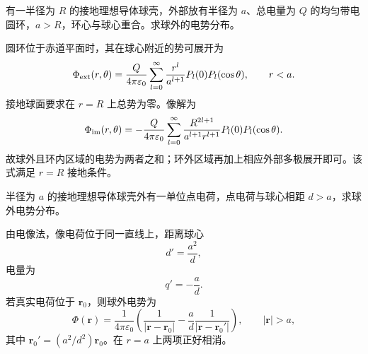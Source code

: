 \begin{question}
有一半径为 \(R\) 的接地理想导体球壳，外部放有半径为 \(a\)、总电量为 \(Q\) 的均匀带电圆环，\(a>R\)，环心与球心重合。求球外的电势分布。
\begin{solution}
圆环位于赤道平面时，其在球心附近的势可展开为
\[
\Phi_{\rm ext}(r,\theta)=\frac{Q}{4\pi\varepsilon_0}
\sum_{l=0}^{\infty}\frac{r^l}{a^{l+1}}P_l(0)P_l(\cos\theta),
\qquad r<a.
\]
接地球面要求在 \(r=R\) 上总势为零。像解为
\[
\Phi_{\rm im}(r,\theta)=
-\frac{Q}{4\pi\varepsilon_0}
\sum_{l=0}^{\infty}\frac{R^{2l+1}}{a^{l+1}r^{l+1}}
P_l(0)P_l(\cos\theta).
\]
故球外且环内区域的电势为两者之和；环外区域再加上相应外部多极展开即可。该式满足 \(r=R\) 接地条件。
\end{solution}
\end{question}

\begin{question}
半径为 \(a\) 的接地理想导体球壳外有一单位点电荷，点电荷与球心相距 \(d>a\)，求球外电势分布。
\begin{solution}
由电像法，像电荷位于同一直线上，距离球心
\[
d'=\frac{a^2}{d},
\]
电量为
\[
q'=-\frac ad.
\]
若真实电荷位于 \(\bm r_0\)，则球外电势为
\[
\Phi(\bm r)=\frac1{4\pi\varepsilon_0}
\left(
\frac1{|\bm r-\bm r_0|}
-\frac ad\frac1{|\bm r-\bm r_0'|}
\right),
\qquad |\bm r|>a,
\]
其中 \(\bm r_0'=(a^2/d^2)\bm r_0\)。在 \(r=a\) 上两项正好相消。
\end{solution}
\end{question}

